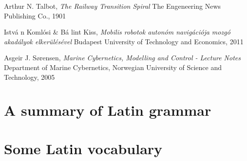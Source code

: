 \documentclass{ifacconf}
\begin{document}
\begin{thebibliography}{xx}

Arthur N. Talbot,
\newblock \emph{The Railway Transition Spiral}
\newblock The Engeneering News Publishing Co., 1901

Istv\'a n Koml\'{o}si \& B\'a lint Kiss, %
\newblock \emph{Mobilis robotok auton\'{o}m navig\'aci\'{o}ja mozg\'{o} akad\'alyok elker\"ul\'es\'evel} %
\newblock Budapest University of Technology and Economics, 2011 %

Asgeir J. S\o rensen,
\newblock \emph{Marine Cybernetics, Modelling and Control - Lecture Notes}
\newblock Department of Marine Cybernetics, Norwegian University of Science and Technology, 2005

\end{thebibliography}








\appendix
\section{A summary of Latin grammar}    %
\section{Some Latin vocabulary}         %
\end{document}
